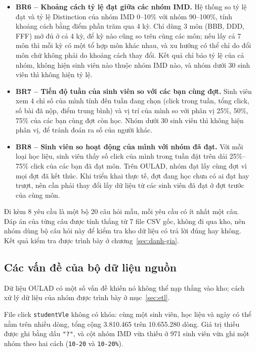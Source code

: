 \begin{itemize}
  \item \textbf{BR6 -- Khoảng cách tỷ lệ đạt giữa các nhóm IMD.} Hệ thống so tỷ lệ đạt và tỷ lệ Distinction của nhóm IMD 0--10\% với nhóm 90--100\%, tính
        khoảng cách bằng điểm phần trăm qua 4 kỳ. Chỉ dùng 3 môn (BBB, DDD, FFF) mở đủ ở cả 4 kỳ, để kỳ nào cũng so trên cùng các môn; nếu lấy cả 7 môn thì mỗi kỳ có một tổ hợp môn khác nhau, và xu hướng có thể chỉ do đổi môn chứ không phải do khoảng cách thay đổi. Kết quả chỉ báo tỷ lệ của cả nhóm, không hiện sinh viên nào thuộc nhóm IMD nào, và nhóm dưới 30 sinh viên thì không hiện tỷ lệ.
  \item \textbf{BR7 -- Tiến độ tuần của sinh viên so với các bạn cùng đợt.} Sinh viên xem 4 chỉ số của mình tính đến tuần đang chọn (click trong tuần, tổng click,
        số bài đã nộp, điểm trung bình) và vị trí của mình so với phân vị 25\%, 50\%, 75\% của các
        bạn cùng đợt còn học. Nhóm dưới 30 sinh viên thì không hiện phân vị, để tránh đoán ra số
        của người khác.
  \item \textbf{BR8 -- Sinh viên so hoạt động của mình với nhóm đã đạt.} Với mỗi loại học liệu, sinh viên thấy số click của mình trong tuần đặt trên dải 25\%--75\%
        click của các bạn đã đạt môn. Trên OULAD, nhóm đạt lấy cùng đợt vì mọi đợt đã kết thúc. Khi triển khai thực tế, đợt đang học chưa có ai đạt hay trượt, nên cần phải thay đổi lấy dữ liệu từ các sinh viên đã đạt ở đợt trước của cùng môn.
\end{itemize}

Đi kèm 8 yêu cầu là một bộ 20 câu hỏi mẫu, mỗi yêu cầu có ít nhất một câu. Đáp án của từng câu được tính thẳng từ 7 file CSV gốc, không đi qua kho, nên nhóm dùng bộ câu hỏi này để kiểm tra kho dữ liệu có trả lời đúng hay không. Kết quả kiểm tra được trình bày ở chương~\ref{sec:danh-gia}.

\subsection{Các vấn đề của bộ dữ liệu nguồn}
\label{sec:van-de-du-lieu}
Dữ liệu OULAD có một số vấn đề khiến nó không thể nạp thẳng vào kho; cách xử lý dữ liệu của nhóm được trình bày ở mục~\ref{sec:etl}.

File click \texttt{studentVle} không có khóa: cùng một sinh viên, học liệu và ngày có thể
nằm trên nhiều dòng, tổng cộng 3.810.465 trên 10.655.280 dòng. Giá trị thiếu được ghi bằng
dấu \texttt{"?"}, và cột nhóm IMD vừa thiếu ở 971 sinh viên vừa ghi một nhóm theo hai cách
(\texttt{10-20} và \texttt{10-20\%}).

